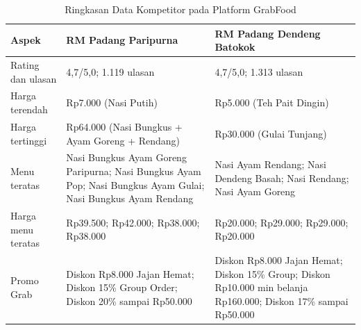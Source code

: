 \begin{table}[h!]
    \centering
    \caption{Ringkasan Data Kompetitor pada Platform GrabFood}
    \label{tab:kompetitor_prasurvey1}
    \begin{tabularx}{\textwidth}{p{3.5cm}YY}
        \toprule
        \textbf{Aspek}     & \textbf{RM Padang Paripurna}                                                                                                       & \textbf{RM Padang Dendeng Batokok}                                                                                                        \\
        \midrule
        Rating dan ulasan  & 4,7/5,0; 1.119 ulasan                                                                                                              & 4,7/5,0; 1.313 ulasan                                                                                                                     \\
        Harga terendah     & Rp7.000 (Nasi Putih)                                                                                                               & Rp5.000 (Teh Pait Dingin)                                                                                                                 \\
        Harga tertinggi    & Rp64.000 (Nasi Bungkus + Ayam Goreng + Rendang)                                                                                    & Rp30.000 (Gulai Tunjang)                                                                                                                  \\
        Menu teratas       & Nasi Bungkus Ayam Goreng Paripurna; Nasi Bungkus Ayam Pop; Nasi Bungkus Ayam Gulai; Nasi Bungkus Ayam Rendang                      & Nasi Ayam Rendang; Nasi Dendeng Basah; Nasi Rendang; Nasi Ayam Goreng                                                                     \\
        Harga menu teratas & Rp39.500; Rp42.000; Rp38.000; Rp38.000                                                                                             & Rp20.000; Rp29.000; Rp29.000; Rp20.000                                                                                                    \\
        Promo Grab         & Diskon Rp8.000 Jajan Hemat; Diskon 15\% Group Order; Diskon 20\% sampai Rp50.000                                                   & Diskon Rp8.000 Jajan Hemat; Diskon 15\% Group; Diskon Rp10.000 min belanja Rp160.000; Diskon 17\% sampai Rp50.000                         \\

\end{tabularx}
\end{table}
